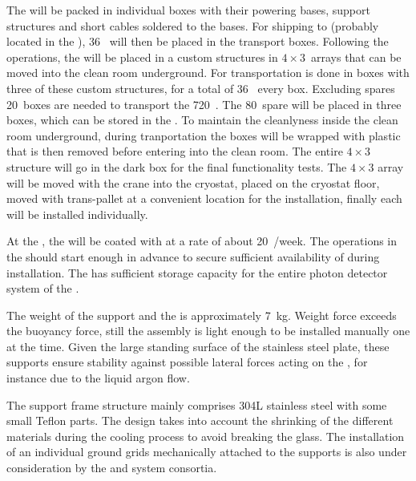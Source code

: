 The  will be packed in individual boxes with their powering bases, support structures and short  cables soldered to the bases.
For shipping to  (probably located in the ), 36~ will then be placed in the transport boxes.
Following the  operations, the  will be placed in a custom structures in $4 \times 3$~arrays that can be moved into the clean room underground.
For transportation is done in boxes with three of these custom structures, for a total of 36~ every box.
Excluding spares 20~boxes are needed to transport the 720~.
The 80~spare  will be placed in three boxes, which can be stored in the .
To maintain the cleanlyness inside the clean room underground, during tranportation the boxes will be wrapped with plastic that is then removed before entering into the clean room.
The entire $4 \times 3$ structure will go in the dark box for the final functionality tests.
The $4 \times 3$ array will be moved with the crane into the cryostat, placed on the cryostat floor, moved with trans-pallet at a convenient location for the installation, finally each  will be installed individually.

At the , the  will be coated with  at a rate of about 20~/week.
The operations in the  should start enough in advance to secure sufficient availability of  during installation.
The  has sufficient storage capacity for the entire photon detector system of the .

The weight of the support and the  is approximately 7~kg.
Weight force exceeds the buoyancy force, still the assembly is light enough to be installed manually one at the time.
Given the large standing surface of the stainless steel plate, these supports ensure stability against possible lateral forces acting on the , for instance due to the liquid argon flow.

The support frame structure mainly comprises 304L stainless steel with some small Teflon parts.
The design takes into account the shrinking of the different materials during the cooling process to avoid breaking the  glass.
The installation of an individual ground grids mechanically attached to the  supports is also under consideration by the  and  system consortia.

